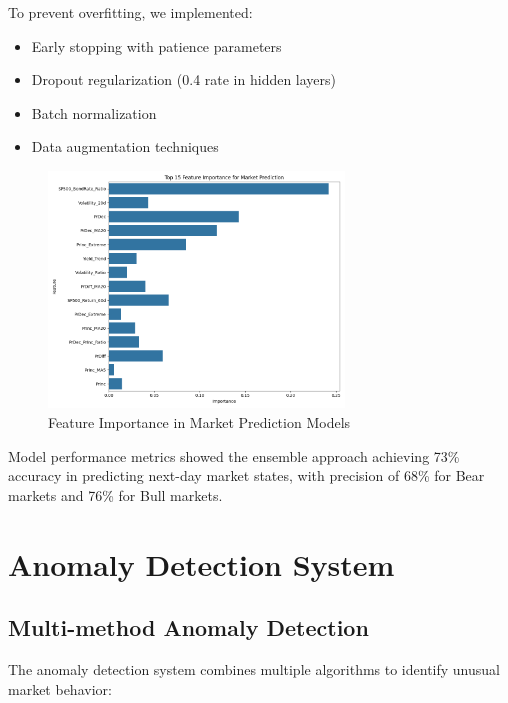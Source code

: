 \documentclass[10pt]{article}
\begin{document}
To prevent overfitting, we implemented:
\begin{itemize}
    \item Early stopping with patience parameters
    \item Dropout regularization (0.4 rate in hidden layers)
    \item Batch normalization 
    \item Data augmentation techniques
\end{itemize}

\begin{figure}[htbp]
    \centering
    \includegraphics[width=0.7\textwidth]{../results/feature_importance.png}
    \caption{Feature Importance in Market Prediction Models}
    \label{fig:feature_importance}
\end{figure}

Model performance metrics showed the ensemble approach achieving 73\% accuracy in predicting next-day market states, with precision of 68\% for Bear markets and 76\% for Bull markets.

\section{Anomaly Detection System}
\subsection{Multi-method Anomaly Detection}
The anomaly detection system combines multiple algorithms to identify unusual market behavior:
\end{document}
